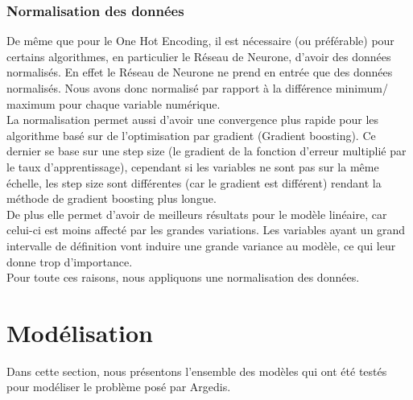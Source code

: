 \documentclass{article} %
\begin{document}
\subsubsection{Normalisation des données}
De même que pour le One Hot Encoding, il est nécessaire (ou préférable) pour certains algorithmes, en particulier le Réseau de Neurone, d'avoir des données normalisés. En effet le Réseau de Neurone ne prend en entrée que des données normalisés. Nous avons donc normalisé par rapport à la différence minimum/ maximum pour chaque variable numérique.\\
La normalisation permet aussi d'avoir une convergence plus rapide pour les algorithme basé sur de l'optimisation par gradient (Gradient boosting). Ce dernier se base sur une step size (le gradient de la fonction d'erreur multiplié par le taux d'apprentissage), cependant si les variables ne sont pas sur la même échelle, les step size sont différentes (car le gradient est différent) rendant la méthode de gradient boosting plus longue.\\
De plus elle permet d'avoir de meilleurs résultats pour le modèle linéaire, car celui-ci est moins affecté par les grandes variations. Les variables ayant un grand intervalle de définition vont induire une grande variance au modèle, ce qui leur donne trop d'importance.\\
Pour toute ces raisons, nous appliquons une normalisation des données.
\newpage
\section{Modélisation}
Dans cette section, nous présentons l'ensemble des modèles qui ont été testés pour modéliser le problème posé par Argedis. 
\end{document}
